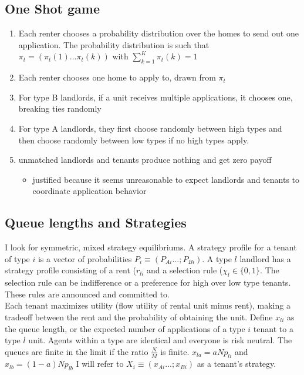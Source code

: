 \documentclass{article}
\begin{document}
\subsection{One Shot game}
\begin{enumerate}
    \item Each renter chooses a probability distribution over the homes to send out one application. The probability distribution is such that $\pi_t = (\pi_t(1) \dots \pi_t(k))$ with $\sum_{k = 1}^{K} \pi_t(k)=1$
    \item Each renter chooses one home to apply to, drawn from $\pi_t$
    \item For type B landlords, if a unit receives multiple applications, it chooses one, breaking ties randomly
    \item For type A landlords, they first choose randomly between high types and then choose randomly between low types if no high types apply.
    \item unmatched landlords and tenants produce nothing and get zero payoff
    \begin{itemize}
        \item justified because it seems unreasonable to expect landlords and tenants to coordinate application behavior
    \end{itemize}

\end{enumerate}

\subsection{Queue lengths and Strategies}
I look for symmetric, mixed strategy equilibriums. A strategy profile for a tenant of type $i$ is a vector of probabilities $P_{i} \equiv (P_{Ai}...;P_{Bi})$. A type $l$ landlord has a strategy profile consisting of a rent ($r_{li}$ and a selection rule ($\chi_l \in \{0,1\}$. The selection rule can be indifference or a preference for high over low type tenants. These rules are announced and committed to. \\

Each tenant maximizes utility (flow utility of rental unit minus rent), making a tradeoff between the rent and the probability of obtaining the unit. Define $x_{li}$ as the queue length, or the expected number of applications of a type $i$ tenant to a type $l$ unit. Agents within a type are identical and everyone is risk neutral. The queues are finite in the limit if the ratio $\frac{N}{M}$ is finite. $x_{la}= aNp_{li}$ and $x_{lb}= (1-a)Np_{lb}$  I will refer to $X_{i} \equiv (x_{Ai}...;x_{Bi})$ as a tenant's strategy.\\
\end{document}
